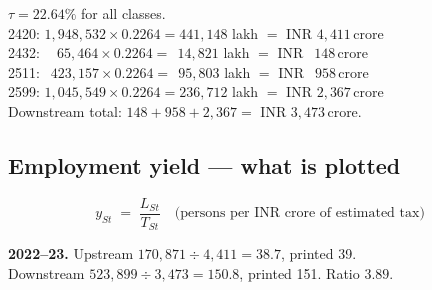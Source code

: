 \documentclass[11pt, a4paper]{article}
\newcommand{\cro}{\,\textrm{crore}}
\begin{document}
\begin{work}
$\tau = 22.64\%$ for all classes. \\[2pt]
2420: $1{,}948{,}532 \times 0.2264 = 441{,}148$ lakh $=$ INR $4{,}411\cro$ \\
2432: $\ \ \ \ 65{,}464 \times 0.2264 = \ \ 14{,}821$ lakh $=$ INR $\ \ 148\cro$ \\
2511: $\ \ 423{,}157 \times 0.2264 = \ \ 95{,}803$ lakh $=$ INR $\ \ 958\cro$ \\
2599: $1{,}045{,}549 \times 0.2264 = 236{,}712$ lakh $=$ INR $2{,}367\cro$ \\[2pt]
Downstream total: $148 + 958 + 2{,}367 = $ INR $3{,}473\cro$.
\end{work}

\subsection{Employment yield --- what is plotted}
\[
y_{St} \;=\; \frac{L_{St}}{T_{St}} \quad \text{(persons per INR crore of estimated tax)}
\]

\begin{work}
\textbf{2022--23.} Upstream $170{,}871 \div 4{,}411 = 38.7$, printed 39. \\
Downstream $523{,}899 \div 3{,}473 = 150.8$, printed 151. Ratio $3.89$.
\end{work}

\begin{table}[H]
\centering\footnotesize
{}
\end{table}
\end{document}
